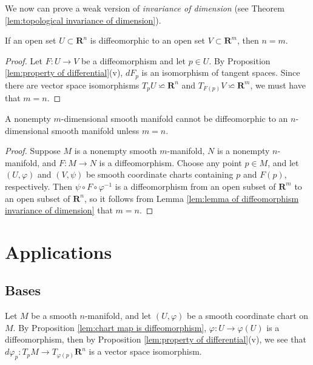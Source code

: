 We now can prove a weak version of \emph{invariance of dimension} (see Theorem \ref{lem:topological invariance of dimension}).

\begin{lemma}\label{lem:lemma of diffeomorphism invariance of dimension}
    If an open set $U \subset \mathbf{R}^n$ is diffeomorphic to an open set $V \subset \mathbf{R}^m$, then $n = m$.
\end{lemma}

\begin{proof}
    Let $F : U \to V$ be a diffeomorphism and let $p \in U$. By Proposition \ref{lem:property of differential}(v), $dF_p$ is an isomorphism of tangent spaces. Since there are vector space isomorphisms $T_pU \backsimeq \mathbf{R}^n$ and $T_{F(p)}V \backsimeq \mathbf{R}^m$, we must have that $m = n$.
\end{proof}

\begin{theorem}
    A nonempty $m$-dimensional smooth manifold cannot  be diffeomorphic to an $n$-dimensional smooth manifold unless $m = n$.
\end{theorem}

\begin{proof}
    Suppose $M$ is a nonempty smooth $m$-manifold, $N$ is a nonempty $n$-manifold, and $F : M \to N$ is a diffeomorphism. Choose any point $p \in M$, and let $(U, \varphi)$ and $(V, \psi)$ be smooth coordinate charts containing $p$ and $F(p)$, respectively. Then $\psi \circ F \circ \varphi^{-1}$ is a diffeomorphism from an open subset of $\mathbf{R}^m$ to an open subset of $\mathbf{R}^n$, so it follows from Lemma \ref{lem:lemma of diffeomorphism invariance of dimension} that $m = n$.
\end{proof}

\section{Applications}

\subsection*{Bases}

Let $M$ be a smooth $n$-manifold, and let $(U, \varphi)$ be a smooth coordinate chart on $M$. By Proposition \ref{lem:chart map is diffeomorphism}, $\varphi : U \to \varphi(U)$ is a diffeomorphism, then by Proposition \ref{lem:property of differential}(v), we see that $d\varphi_p : T_pM \to T_{\varphi(p)}\mathbf{R}^n$ is a vector space isomorphism.

